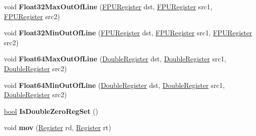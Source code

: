 \begin{DoxyCompactItemize}
\item 
\mbox{\label{classv8_1_1internal_1_1TurboAssembler_a7b389501f2514c3642becd5469512abc}} 
void {\bfseries Float32\+Max\+Out\+Of\+Line} (\mbox{\hyperlink{classv8_1_1internal_1_1FPURegister}{F\+P\+U\+Register}} dst, \mbox{\hyperlink{classv8_1_1internal_1_1FPURegister}{F\+P\+U\+Register}} src1, \mbox{\hyperlink{classv8_1_1internal_1_1FPURegister}{F\+P\+U\+Register}} src2)
\item 
\mbox{\label{classv8_1_1internal_1_1TurboAssembler_a4c90f67dc99803675880326d9754b6be}} 
void {\bfseries Float32\+Min\+Out\+Of\+Line} (\mbox{\hyperlink{classv8_1_1internal_1_1FPURegister}{F\+P\+U\+Register}} dst, \mbox{\hyperlink{classv8_1_1internal_1_1FPURegister}{F\+P\+U\+Register}} src1, \mbox{\hyperlink{classv8_1_1internal_1_1FPURegister}{F\+P\+U\+Register}} src2)
\item 
\mbox{\label{classv8_1_1internal_1_1TurboAssembler_a3b93c17d9432b267a2a9a59ed7f0ec57}} 
void {\bfseries Float64\+Max\+Out\+Of\+Line} (\mbox{\hyperlink{classv8_1_1internal_1_1DoubleRegister}{Double\+Register}} dst, \mbox{\hyperlink{classv8_1_1internal_1_1DoubleRegister}{Double\+Register}} src1, \mbox{\hyperlink{classv8_1_1internal_1_1DoubleRegister}{Double\+Register}} src2)
\item 
\mbox{\label{classv8_1_1internal_1_1TurboAssembler_a47d862658f8cd715620e67d675a394e2}} 
void {\bfseries Float64\+Min\+Out\+Of\+Line} (\mbox{\hyperlink{classv8_1_1internal_1_1DoubleRegister}{Double\+Register}} dst, \mbox{\hyperlink{classv8_1_1internal_1_1DoubleRegister}{Double\+Register}} src1, \mbox{\hyperlink{classv8_1_1internal_1_1DoubleRegister}{Double\+Register}} src2)
\item 
\mbox{\label{classv8_1_1internal_1_1TurboAssembler_a3848b869c29af1443755ff35caf8d601}} 
\mbox{\hyperlink{classbool}{bool}} {\bfseries Is\+Double\+Zero\+Reg\+Set} ()
\item 
\mbox{\label{classv8_1_1internal_1_1TurboAssembler_ae334b4461517c9e4dcd3687799c68f60}} 
void {\bfseries mov} (\mbox{\hyperlink{classv8_1_1internal_1_1Register}{Register}} rd, \mbox{\hyperlink{classv8_1_1internal_1_1Register}{Register}} rt)

\end{DoxyCompactItemize}
